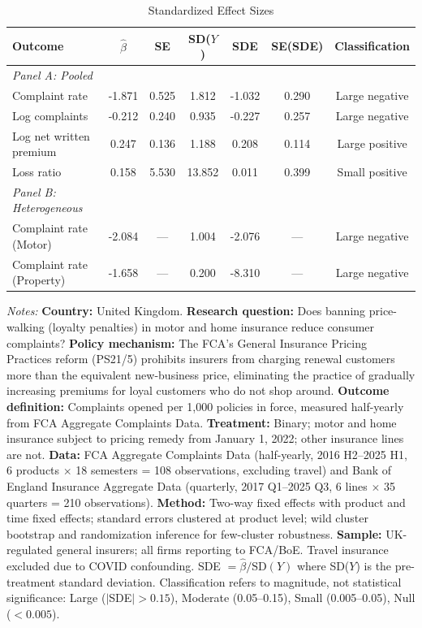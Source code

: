 \begin{table}[t]
\centering
\begin{threeparttable}
\caption{Standardized Effect Sizes}
\label{tab:sde}
\small
\begin{tabular}{lcccccc}
\toprule
Outcome & $\hat{\beta}$ & SE & SD($Y$) & SDE & SE(SDE) & Classification \\
\midrule
\textit{Panel A: Pooled} & & & & & & \\
\quad Complaint rate & -1.871 & 0.525 & 1.812 & -1.032 & 0.290 & Large negative \\
\quad Log complaints & -0.212 & 0.240 & 0.935 & -0.227 & 0.257 & Large negative \\
\quad Log net written premium & 0.247 & 0.136 & 1.188 & 0.208 & 0.114 & Large positive \\
\quad Loss ratio & 0.158 & 5.530 & 13.852 & 0.011 & 0.399 & Small positive \\
\midrule
\textit{Panel B: Heterogeneous} & & & & & & \\
\quad Complaint rate (Motor) & -2.084 & --- & 1.004 & -2.076 & --- & Large negative \\
\quad Complaint rate (Property) & -1.658 & --- & 0.200 & -8.310 & --- & Large negative \\
\bottomrule
\end{tabular}
\begin{tablenotes}[flushleft]
\footnotesize
\item \textit{Notes:} \textbf{Country:} United Kingdom. \textbf{Research question:} Does banning price-walking (loyalty penalties) in motor and home insurance reduce consumer complaints? \textbf{Policy mechanism:} The FCA's General Insurance Pricing Practices reform (PS21/5) prohibits insurers from charging renewal customers more than the equivalent new-business price, eliminating the practice of gradually increasing premiums for loyal customers who do not shop around. \textbf{Outcome definition:} Complaints opened per 1,000 policies in force, measured half-yearly from FCA Aggregate Complaints Data. \textbf{Treatment:} Binary; motor and home insurance subject to pricing remedy from January 1, 2022; other insurance lines are not. \textbf{Data:} FCA Aggregate Complaints Data (half-yearly, 2016 H2--2025 H1, 6 products $\times$ 18 semesters = 108 observations, excluding travel) and Bank of England Insurance Aggregate Data (quarterly, 2017 Q1--2025 Q3, 6 lines $\times$ 35 quarters = 210 observations). \textbf{Method:} Two-way fixed effects with product and time fixed effects; standard errors clustered at product level; wild cluster bootstrap and randomization inference for few-cluster robustness. \textbf{Sample:} UK-regulated general insurers; all firms reporting to FCA/BoE. Travel insurance excluded due to COVID confounding. SDE $= \hat{\beta} / \text{SD}(Y)$ where SD($Y$) is the pre-treatment standard deviation. Classification refers to magnitude, not statistical significance: Large ($|$SDE$| > 0.15$), Moderate (0.05--0.15), Small (0.005--0.05), Null ($< 0.005$).
\end{tablenotes}
\end{threeparttable}
\end{table}
